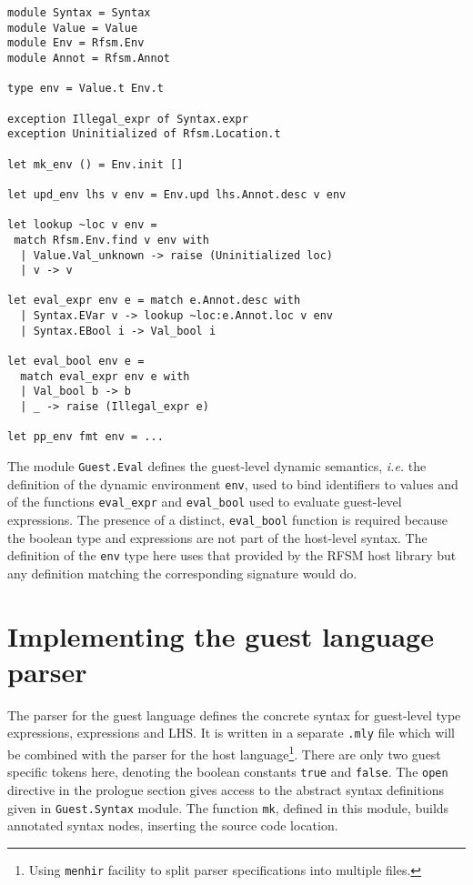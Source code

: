 \begin{lstlisting}[language={[Objective]Caml},frame=single,basicstyle=\small,caption={Module
    \texttt{Guest.Eval} (excerpt)},label={lst:mini-eval}]
module Syntax = Syntax
module Value = Value
module Env = Rfsm.Env
module Annot = Rfsm.Annot

type env = Value.t Env.t

exception Illegal_expr of Syntax.expr
exception Uninitialized of Rfsm.Location.t

let mk_env () = Env.init []

let upd_env lhs v env = Env.upd lhs.Annot.desc v env

let lookup ~loc v env = 
 match Rfsm.Env.find v env with
  | Value.Val_unknown -> raise (Uninitialized loc)
  | v -> v

let eval_expr env e = match e.Annot.desc with
  | Syntax.EVar v -> lookup ~loc:e.Annot.loc v env
  | Syntax.EBool i -> Val_bool i 

let eval_bool env e = 
  match eval_expr env e with
  | Val_bool b -> b
  | _ -> raise (Illegal_expr e) 

let pp_env fmt env = ...
\end{lstlisting}

The module \verb|Guest.Eval| defines the guest-level dynamic semantics, \emph{i.e.} the definition
of the dynamic environment \texttt{env}, used to bind identifiers to values and of the 
functions \verb|eval_expr| and \verb|eval_bool| used to evaluate guest-level expressions. The
presence of a distinct, \verb|eval_bool| function is required because the boolean type and
expressions are not part of the host-level syntax. The definition of the \texttt{env} type here uses
that provided by the RFSM host library but any definition matching the corresponding signature would do.

\section{Implementing the guest language parser}

The parser for the guest language defines the concrete syntax for guest-level type expressions,
expressions and LHS. It is written in a separate \texttt{.mly} file which will be combined with the
parser for the host language\footnote{Using \texttt{menhir} facility to split parser specifications
  into multiple files.}. There are only two guest specific tokens here, denoting the boolean
constants \texttt{true} and \texttt{false}. The \texttt{open} directive in the prologue section
gives access to the abstract syntax definitions given in \texttt{Guest.Syntax} module. The function
\texttt{mk}, defined in this module, builds annotated syntax nodes, inserting the source code
location. 

